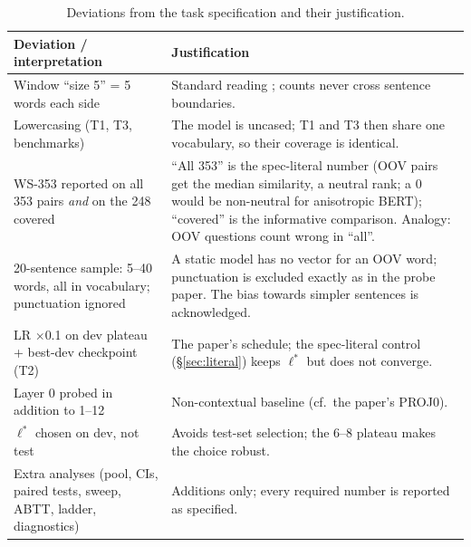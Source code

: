 \documentclass[11pt,a4paper]{article}
\newcommand{\lstar}{\ensuremath{\ell^*}}
\begin{document}
\begin{table}[H]\centering\footnotesize\setlength{\tabcolsep}{4pt}
\begin{tabular}{p{}p{}}
\toprule
Deviation / interpretation & Justification \\
\midrule
Window ``size 5'' = 5 words each side & Standard reading \citep{levy2015}; counts never cross sentence boundaries. \\
Lowercasing (T1, T3, benchmarks) & The model is uncased; T1 and T3 then share one vocabulary, so their coverage is identical. \\
WS-353 reported on all 353 pairs \emph{and} on the 248 covered & ``All 353'' is the spec-literal number (OOV pairs get the median similarity, a neutral rank; a 0 would be non-neutral for anisotropic BERT); ``covered'' is the informative comparison. Analogy: OOV questions count wrong in ``all''. \\
20-sentence sample: 5--40 words, all in vocabulary; punctuation ignored & A static model has no vector for an OOV word; punctuation is excluded exactly as in the probe paper. The bias towards simpler sentences is acknowledged. \\
LR $\times$0.1 on dev plateau + best-dev checkpoint (T2) & The paper's schedule; the spec-literal control (\S\ref{sec:literal}) keeps \lstar{} but does not converge. \\
Layer 0 probed in addition to 1--12 & Non-contextual baseline (cf.\ the paper's PROJ0). \\
\lstar{} chosen on dev, not test & Avoids test-set selection; the 6--8 plateau makes the choice robust. \\
Extra analyses (pool, CIs, paired tests, sweep, ABTT, ladder, diagnostics) & Additions only; every required number is reported as specified. \\
\bottomrule
\end{tabular}
\caption{Deviations from the task specification and their justification.}\label{tab:dev}\end{table}
\end{document}
